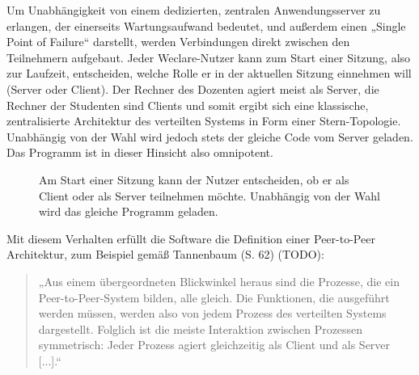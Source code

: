 Um Unabhängigkeit von einem dedizierten, zentralen Anwendungsserver zu erlangen, der einerseits Wartungsaufwand bedeutet, und außerdem einen „Single Point of Failure“ darstellt, werden Verbindungen direkt zwischen den Teilnehmern aufgebaut. Jeder Weclare-Nutzer kann zum Start einer Sitzung, also zur Laufzeit, entscheiden, welche Rolle er in der aktuellen Sitzung einnehmen will (Server oder Client). Der Rechner des Dozenten agiert meist als Server, die Rechner der Studenten sind Clients und somit ergibt sich eine klassische, zentralisierte Architektur des verteilten Systems in Form einer Stern-Topologie. Unabhängig von der Wahl wird jedoch stets der gleiche Code vom Server geladen. Das Programm ist in dieser Hinsicht also omnipotent.

\begin{figure}[H]
    \centering
    \setlength{\fboxsep}{0pt}
    \setlength{\fboxrule}{0.5pt}
    \caption{Am Start einer Sitzung kann der Nutzer entscheiden, ob er als Client oder als Server teilnehmen möchte. Unabhängig von der Wahl wird das gleiche Programm geladen.}
    \label{abb:weclare_start}
\end{figure}

Mit diesem Verhalten erfüllt die Software die Definition einer Peer-to-Peer Architektur, zum Beispiel gemäß Tannenbaum (S. 62) (TODO):

\begin{quotation}
„Aus einem übergeordneten Blickwinkel heraus sind die Prozesse, die ein Peer-to-Peer-System bilden, alle gleich. Die Funktionen, die ausgeführt werden müssen, werden also von jedem Prozess des verteilten Systems dargestellt. Folglich ist die meiste Interaktion zwischen Prozessen symmetrisch: Jeder Prozess agiert gleichzeitig als Client und als Server [...].“
\end{quotation}

